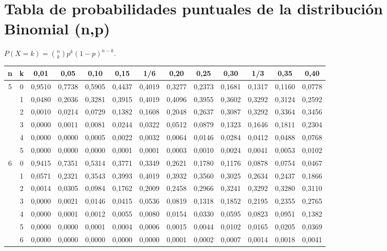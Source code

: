 \documentclass{article}
\numberwithin{equation}{section}
\theoremstyle{plain}  %
\begin{document}
\section{Tabla de probabilidades puntuales de la distribución Binomial (n,p)}
$P(X = k) = \binom{n}{k}p^{k}(1-p)^{n-k}$. \\
\begin{tabular}{|c|c|c|c|c|c|c|c|c|c|c|c|c|}
    \hline
    n & k & 0,01   & 0,05   &0,10   &0,15   &1/6    &0,20   &0,25   &0,30   &1/3    &0,35   &0,40   \\ \hline
    5 & 0 & 0,9510 & 0,7738 &0,5905 &0,4437 &0,4019 &0,3277 &0,2373 &0,1681 &0,1317 &0,1160 &0,0778 \\
      & 1 & 0,0480 & 0,2036 &0,3281 &0,3915 &0,4019 &0,4096 &0,3955 &0,3602 &0,3292 &0,3124 &0,2592 \\
      & 2 & 0,0010 & 0,0214 &0,0729 &0,1382 &0,1608 &0,2048 &0,2637 &0,3087 &0,3292 &0,3364 &0,3456 \\
      & 3 & 0,0000 & 0,0011 &0,0081 &0,0244 &0,0322 &0,0512 &0,0879 &0,1323 &0,1646 &0,1811 &0,2304 \\
      & 4 & 0,0000 & 0,0000 &0,0005 &0,0022 &0,0032 &0,0064 &0,0146 &0,0284 &0,0412 &0,0488 &0,0768 \\
      & 5 & 0,0000 & 0,0000 &0,0000 &0,0001 &0,0001 &0,0003 &0,0010 &0,0024 &0,0041 &0,0053 &0,0102  \\ 
    6 &0 &0,9415 &0,7351 &0,5314 &0,3771 &0,3349 &0,2621 &0,1780 &0,1176 &0,0878 &0,0754 &0,0467 \\
      &1 &0,0571 &0,2321 &0,3543 &0,3993 &0,4019 &0,3932 &0,3560 &0,3025 &0,2634 &0,2437 &0,1866 \\
      &2 &0,0014 &0,0305 &0,0984 &0,1762 &0,2009 &0,2458 &0,2966 &0,3241 &0,3292 &0,3280 &0,3110 \\
      &3 &0,0000 &0,0021 &0,0146 &0,0415 &0,0536 &0,0819 &0,1318 &0,1852 &0,2195 &0,2355 &0,2765 \\
      &4 &0,0000 &0,0001 &0,0012 &0,0055 &0,0080 &0,0154 &0,0330 &0,0595 &0,0823 &0,0951 &0,1382 \\
      &5 &0,0000 &0,0000 &0,0001 &0,0004 &0,0006 &0,0015 &0,0044 &0,0102 &0,0165 &0,0205 &0,0369 \\
      &6 &0,0000 &0,0000 &0,0000 &0,0000 &0,0000 &0,0001 &0,0002 &0,0007 &0,0014 &0,0018 &0,0041\\ \hline
\end{tabular}
\end{document}

